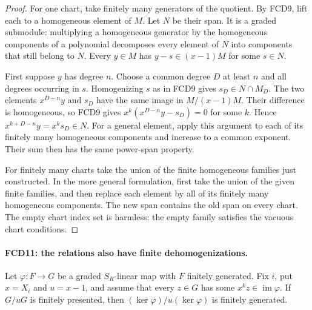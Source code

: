 \documentclass[11pt,a4paper]{article}
\numberwithin{equation}{section}
\theoremstyle{remark}\newtheorem{remark}[theorem]{Remark}
\begin{document}
\begin{proof}
For one chart, take finitely many generators of the quotient.
By FCD9, lift each to a homogeneous element of $M$.  Let $N$
be their span.  It is a graded submodule: multiplying a homogeneous
generator by the homogeneous components of a polynomial decomposes
every element of $N$ into components that still belong to $N$.
Every $y\in M$ has $y-s\in(x-1)M$ for some $s\in N$.

First suppose $y$ has degree $n$.  Choose a common degree $D$
at least $n$ and all degrees occurring in $s$.  Homogenizing $s$
as in FCD9 gives $s_D\in N\cap M_D$.  The two elements
$x^{D-n}y$ and $s_D$ have the same image in $M/(x-1)M$.
Their difference is homogeneous, so FCD9 gives
$x^k(x^{D-n}y-s_D)=0$ for some $k$.  Hence
$x^{k+D-n}y=x^ks_D\in N$.  For a general element, apply
this argument to each of its finitely many homogeneous components
and increase to a common exponent.  Their sum then has the same
power-span property.

For finitely many charts take the union of the finite homogeneous
families just constructed.  In the more general formulation, first
take the union of the given finite families, and then replace each
element by all of its finitely many homogeneous components.  The
new span contains the old span on every chart.  The empty chart
index set is harmless: the empty family satisfies the vacuous
chart conditions.
\end{proof}

\paragraph{FCD11: the relations also have finite dehomogenizations.}
\label{claim:FCD11}
Let $\varphi:F\to G$ be a graded $S_R$-linear map with $F$
finitely generated.  Fix $i$, put $x=X_i$ and $u=x-1$, and
assume that every $z\in G$ has some $x^kz\in\operatorname{im}\varphi$.
If $G/uG$ is finitely presented, then
$(\ker\varphi)/u(\ker\varphi)$ is finitely generated.
\end{document}
